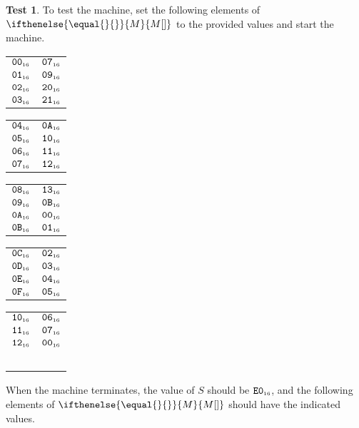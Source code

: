 \documentclass[a4paper,12pt]{article}
\makeatletter
\newcommand{\num}[1]{\texttt{#1}}
\newcommand{\hex}[1]{\num{#1}_{\textup{\tiny 16}}}
\newcommand{\MEM}[1]{\ifthenelse{\equal{#1}{}}{M}{M[#1]}}
\newcommand{\SP}{S}
\theoremstyle{definition}
\newtheorem{test}{Test}
\newenvironment{memtable}{%
  \begin{trivlist}
    \item
    }{%
    \end{trivlist}}
\newenvironment{memcolumn}{%
  \begin{tabular}{@{}ll@{}}
    \hline}
    {%
    \hline
  \end{tabular}}
\newcommand{\memspace}{\qquad}
\makeatother
\begin{document}
\begin{test}
  To test the machine, set the following elements of $\MEM{}$ to the provided values and start the machine.
  \begin{memtable}
    \begin{memcolumn}
      $\hex{00}$ & $\hex{07}$ \\
      $\hex{01}$ & $\hex{09}$ \\
      $\hex{02}$ & $\hex{20}$ \\
      $\hex{03}$ & $\hex{21}$ \\
    \end{memcolumn}
    \memspace
    \begin{memcolumn}
      $\hex{04}$ & $\hex{0A}$ \\
      $\hex{05}$ & $\hex{10}$ \\
      $\hex{06}$ & $\hex{11}$ \\
      $\hex{07}$ & $\hex{12}$ \\
    \end{memcolumn}
    \memspace
    \begin{memcolumn}
      $\hex{08}$ & $\hex{13}$ \\
      $\hex{09}$ & $\hex{0B}$ \\
      $\hex{0A}$ & $\hex{00}$ \\
      $\hex{0B}$ & $\hex{01}$ \\
    \end{memcolumn}
    \memspace
    \begin{memcolumn}
      $\hex{0C}$ & $\hex{02}$ \\
      $\hex{0D}$ & $\hex{03}$ \\
      $\hex{0E}$ & $\hex{04}$ \\
      $\hex{0F}$ & $\hex{05}$ \\
    \end{memcolumn}
    \memspace
    \begin{memcolumn}
      $\hex{10}$ & $\hex{06}$ \\
      $\hex{11}$ & $\hex{07}$ \\
      $\hex{12}$ & $\hex{00}$ \\
      ~\\
    \end{memcolumn}
  \end{memtable}
  When the machine terminates, the value of $\SP$ should be $\hex{E0}$, and the following elements of $\MEM{}$ should have the indicated values.
  \begin{memtable}
    \begin{memcolumn}

\end{memcolumn}
\end{memtable}
\end{test}
\end{document}
